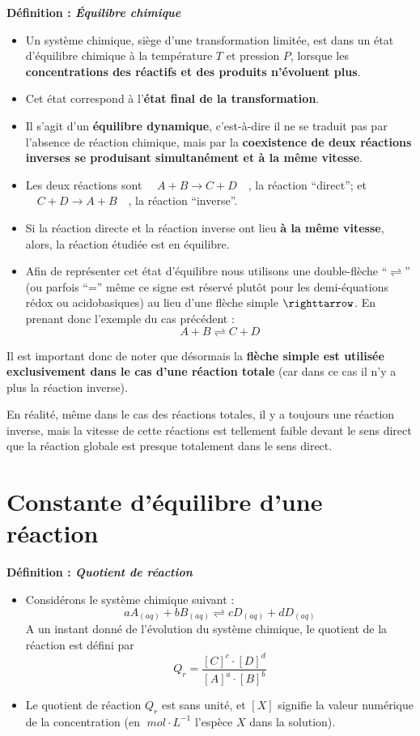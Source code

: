\documentclass[11pt,a4paper]{article}
\newcommand{\mpl}{\; mol\cdot L^{-1}}
\newenvironment{defn}[1]
 {\begin{leftbar}\noindent \textbf{Définition :\textit{ \quad #1}} } { \end{leftbar}}
\begin{document}
\begin{defn}{Équilibre chimique}
\begin{itemize}
    \item Un système chimique, siège d’une transformation limitée, est dans un état d’équilibre chimique à la température $T$ et pression $P$, lorsque les \textbf{concentrations des réactifs et des produits n’évoluent plus}.  
    \item Cet état correspond à l’\textbf{état final de la transformation}.  
    \item Il s'agit d'un \textbf{équilibre dynamique}, c’est-à-dire il ne se traduit pas par l’absence de réaction chimique, mais par la \textbf{coexistence de deux réactions inverses se produisant simultanément et à la même vitesse}. 
    \item Les deux réactions sont $\quad A+B\longrightarrow C + D \quad $, la réaction ``direct''; et $\quad  C + D \longrightarrow A + B \quad $, la réaction ``inverse''.
    \item Si la réaction directe et la réaction inverse ont lieu \textbf{à la même vitesse}, alors, la réaction étudiée est en équilibre. 
    \item Afin de représenter cet état d’équilibre nous utilisons une double-flèche ``$\rightleftharpoons$'' (ou parfois ``='' même ce signe est réservé plutôt pour les demi-équations rédox ou acidobasiques) au lieu d'une flèche simple $\righttarrow$. En prenant donc l’exemple du cas précédent : \[ A + B \rightleftharpoons C + D \]
\end{itemize}
\end{defn}

Il est important donc de noter que désormais la \textbf{flèche simple est utilisée exclusivement dans le cas d'une réaction totale} (car dans ce cas il n’y a plus la réaction inverse). 

En réalité, même dans le cas des réactions totales, il y a toujours une réaction inverse, mais la vitesse de cette réactions est tellement faible devant le sens direct que la réaction globale est presque totalement dans le sens direct. 


\section*{Constante d'équilibre d'une réaction}

\begin{defn}{Quotient de réaction}
\begin{itemize}
    \item Considérons le système chimique suivant : \[aA_{(aq)} + bB_{(aq)} \rightleftharpoons cD_{(aq)} + dD_{(aq)}\]
    A un instant donné de l'évolution du système chimique, le quotient de la réaction est défini par  
    \[
    Q_r = \dfrac{\left[C\right]^c\cdot\left[D\right]^d}{\left[A\right]^a\cdot\left[B\right]^b}
    \]
    \item Le quotient de réaction $Q_r$  est sans unité, et $[X]$  signifie la valeur numérique de la concentration (en $\mpl$ l’espèce $X$ dans la solution).
\end{itemize}
\end{defn}
\end{document}
